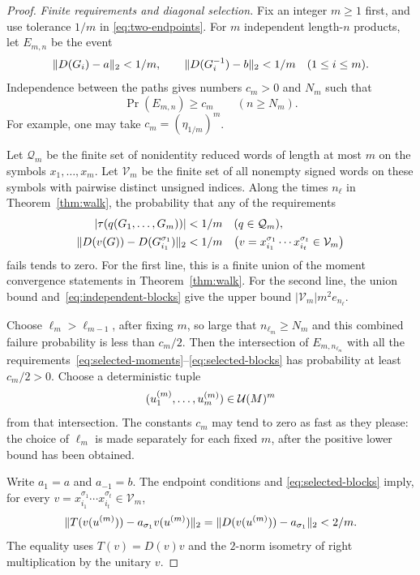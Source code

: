 \begin{proof}
\medskip\noindent
\emph{Finite requirements and diagonal selection.}
Fix an integer $m\ge1$ first, and use tolerance $1/m$ in
\eqref{eq:two-endpoints}.  For $m$ independent length-$n$ products,
let $E_{m,n}$ be the event
\[
 \lVert D(G_i)-a\rVert_2<1/m,\qquad
 \lVert D(G_i^{-1})-b\rVert_2<1/m
 \quad(1\le i\le m).
\]
Independence between the paths gives numbers $c_m>0$ and $N_m$ such
that
\begin{equation}\label{eq:conditioning-mass}
 \Pr(E_{m,n})\ge c_m\qquad(n\ge N_m).
\end{equation}
For example, one may take $c_m=(\eta_{1/m})^m$.

Let $\mathcal Q_m$ be the finite set of nonidentity reduced words of
length at most $m$ on the symbols $x_1,\ldots,x_m$.  Let
$\mathcal V_m$ be the finite set of all nonempty signed words on these
symbols with pairwise distinct unsigned indices.  Along the times
$n_\ell$ in Theorem~\ref{thm:walk}, the probability that any of the
requirements
\begin{align}
 |\tau(q(G_1,\ldots,G_m))|&<1/m
       &&(q\in\mathcal Q_m),\label{eq:selected-moments}\\
 \lVert D(v(G))-D(G_{i_1}^{\sigma_1})\rVert_2&<1/m
       &&\bigl(v=x_{i_1}^{\sigma_1}\cdots x_{i_t}^{\sigma_t}
                   \in\mathcal V_m\bigr)\label{eq:selected-blocks}
\end{align}
fails tends to zero.  For the first line, this is a finite union of
the moment convergence statements in Theorem~\ref{thm:walk}.  For the
second line, the union bound and~\eqref{eq:independent-blocks} give
the upper bound $|\mathcal V_m|m^2e_{n_\ell}$.

Choose $\ell_m>\ell_{m-1}$, after fixing $m$, so large that
$n_{\ell_m}\ge N_m$ and this combined failure probability is less
than $c_m/2$.  Then the intersection of $E_{m,n_{\ell_m}}$ with all
the requirements~\eqref{eq:selected-moments}--\eqref{eq:selected-blocks}
has probability at least $c_m/2>0$.  Choose a deterministic tuple
\[
 (u_1^{(m)},\ldots,u_m^{(m)})\in\mathcal U(M)^m
\]
from that intersection.  The constants $c_m$ may tend to zero as fast
as they please: the choice of $\ell_m$ is made separately for each
fixed $m$, after the positive lower bound has been obtained.

Write $a_1=a$ and $a_{-1}=b$.  The endpoint conditions and
\eqref{eq:selected-blocks} imply, for every
$v=x_{i_1}^{\sigma_1}\cdots x_{i_t}^{\sigma_t}\in\mathcal V_m$,
\begin{equation}\label{eq:selected-multipliers}
 \lVert T(v(u^{(m)}))-a_{\sigma_1}v(u^{(m)})\rVert_2
 =\lVert D(v(u^{(m)}))-a_{\sigma_1}\rVert_2<2/m.
\end{equation}
The equality uses $T(v)=D(v)v$ and the $2$-norm isometry of right
multiplication by the unitary $v$.


\end{proof}
